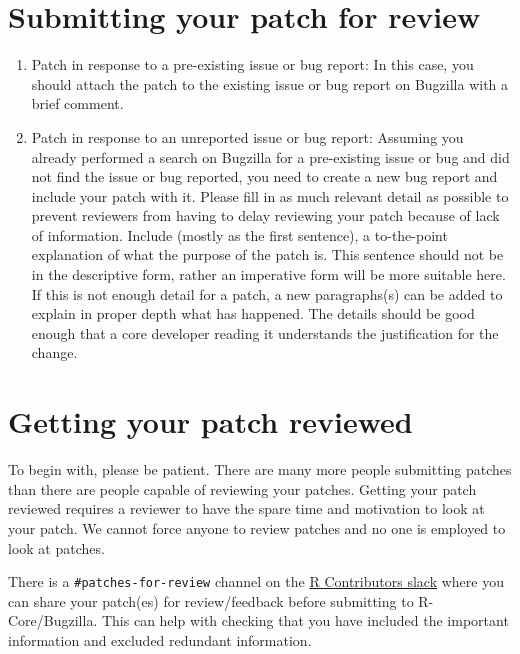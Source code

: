 \documentclass[
]{book}
\begin{document}
\hypertarget{submitting-your-patch-for-review}{%
\section{Submitting your patch for review}\label{submitting-your-patch-for-review}}

\begin{enumerate}
\def\labelenumi{\arabic{enumi}.}
\item
  Patch in response to a pre-existing issue or bug report: In this case, you should attach the patch to the existing issue or bug report on Bugzilla with a brief comment.
\item
  Patch in response to an unreported issue or bug report: Assuming you already performed a search on Bugzilla for a pre-existing issue or bug and did not find the issue or bug reported, you need to create a new bug report and include your patch with it. Please fill in as much relevant detail as possible to prevent reviewers from having to delay reviewing your patch because of lack of information. Include (mostly as the first sentence), a to-the-point explanation of what the purpose of the patch is. This sentence should not be in the descriptive form, rather an imperative form will be more suitable here. If this is not enough detail for a patch, a new paragraphs(s) can be added to explain in proper depth what has happened. The details should be good enough that a core developer reading it understands the justification for the change.
\end{enumerate}

\hypertarget{getting-your-patch-reviewed}{%
\section{Getting your patch reviewed}\label{getting-your-patch-reviewed}}

To begin with, please be patient. There are many more people submitting patches than there are people capable of reviewing your patches. Getting your patch reviewed requires a reviewer to have the spare time and motivation to look at your patch. We cannot force anyone to review patches and no one is employed to look at patches.

There is a \texttt{\#patches-for-review} channel on the \href{https://r-contributors.slack.com/}{R Contributors slack} where you can share your patch(es) for review/feedback before submitting to R-Core/Bugzilla. This can help with checking that you have included the important information and excluded redundant information.
\end{document}
